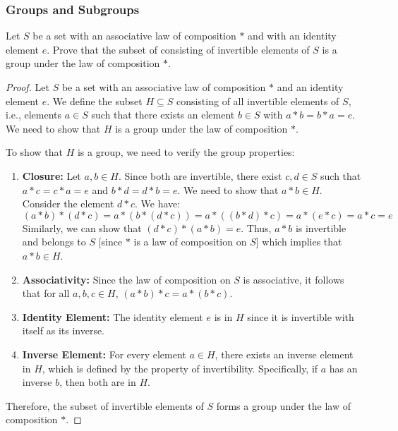 \documentclass[openany]{book}
\begin{document}
\subsubsection{Groups and Subgroups}
\begin{exercise}
    Let $S$ be a set with an associative law of composition $*$ and with an identity element $e$. Prove that the subset of consisting of invertible elements of $S$ is a group under the law of composition $*$.
\end{exercise}
\begin{proof}
    Let $S$ be a set with an associative law of composition $*$ and an identity element $e$. We define the subset $H \subseteq S$ consisting of all invertible elements of $S$, i.e., elements $a \in S$ such that there exists an element $b \in S$ with $a * b = b * a = e$. We need to show that $H$ is a group under the law of composition $*$.
    
    To show that $H$ is a group, we need to verify the group properties:
    \begin{enumerate}
        \item \textbf{Closure:} Let $a, b \in H$. Since both are invertible, there exist $c, d \in S$ such that $a * c = c * a = e$ and $b * d = d * b = e$. We need to show that $a * b \in H$. Consider the element $d * c$. We have:
        $$ (a * b) * (d * c) = a * (b * (d * c)) = a * ((b * d) * c) = a * (e * c) = a * c = e$$
        Similarly, we can show that $(d * c) * (a * b) = e$. Thus, $a * b$ is invertible and belongs to $S$ [since $*$ is a law of composition on $S$] which implies that $a * b \in H$.
        
        \item \textbf{Associativity:} Since the law of composition on $S$ is associative, it follows that for all $a, b, c \in H$, $(a * b) * c = a * (b * c)$.
        
        \item \textbf{Identity Element:} The identity element $e$ is in $H$ since it is invertible with itself as its inverse.
        
        \item \textbf{Inverse Element:} For every element $a \in H$, there exists an inverse element in $H$, which is defined by the property of invertibility. Specifically, if $a$ has an inverse $b$, then both are in $H$.
    \end{enumerate}
    Therefore, the subset of invertible elements of $S$ forms a group under the law of composition $*$.
\end{proof}
\end{document}
